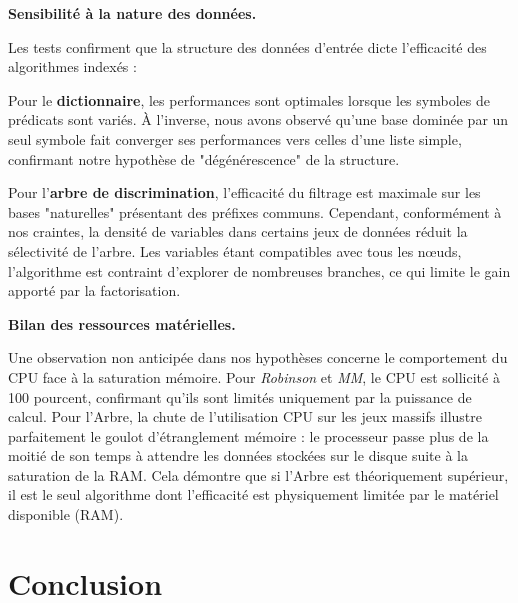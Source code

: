 \documentclass[11pt]{article}
\newenvironment{paraph}[1]{%
  \medskip
  \noindent\textbf{#1.}\quad

  \vspace{0.2cm}
}{%
  \medskip
}
\begin{document}
\begin{paraph}{Sensibilité à la nature des données}
    Les tests confirment que la structure des données d'entrée dicte l'efficacité des algorithmes indexés :
    
    \vspace{0.2cm}
    Pour le \textbf{dictionnaire}, les performances sont optimales lorsque les symboles de prédicats sont variés. À l'inverse, nous avons observé qu'une base dominée par un seul symbole fait converger ses performances vers celles d'une liste simple, confirmant notre hypothèse de "dégénérescence" de la structure.

    \vspace{0.2cm}
    Pour l'\textbf{arbre de discrimination}, l'efficacité du filtrage est maximale sur les bases "naturelles" présentant des préfixes communs. Cependant, conformément à nos craintes, la densité de variables dans certains jeux de données réduit la sélectivité de l'arbre. Les variables étant compatibles avec tous les nœuds, l'algorithme est contraint d'explorer de nombreuses branches, ce qui limite le gain apporté par la factorisation.
\end{paraph}

\begin{paraph}{Bilan des ressources matérielles}
    Une observation non anticipée dans nos hypothèses concerne le comportement du CPU face à la saturation mémoire. Pour \textit{Robinson} et \textit{MM}, le CPU est sollicité à 100 pourcent, confirmant qu'ils sont limités uniquement par la puissance de calcul. 
    Pour l'Arbre, la chute de l'utilisation CPU sur les jeux massifs illustre parfaitement le goulot d'étranglement mémoire : le processeur passe plus de la moitié de son temps à attendre les données stockées sur le disque suite à la saturation de la RAM. Cela démontre que si l'Arbre est théoriquement supérieur, il est le seul algorithme dont l'efficacité est physiquement limitée par le matériel disponible (RAM).
\end{paraph}



\newpage

\section*{Conclusion}


\newpage

\printbibliography
\end{document}

